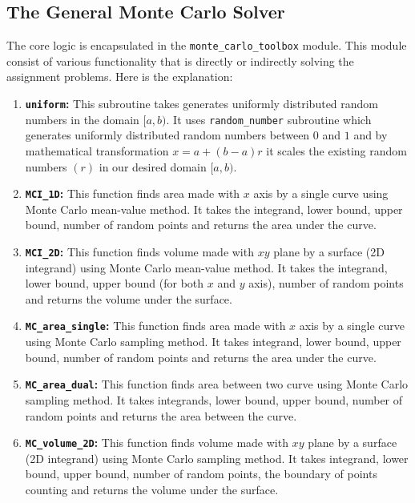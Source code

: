 \documentclass[12pt, a4paper, twoside]{article}
\begin{document}
        \subsection{The General Monte Carlo Solver}
        The core logic is encapsulated in the \texttt{monte\_carlo\_toolbox} module.
        This module consist of various functionality that is directly or indirectly solving the assignment problems. Here is the explanation:
        \begin{enumerate}
            \item {\bf \texttt{uniform}:} This subroutine takes generates uniformly distributed random numbers in the domain $[a, b)$. It uses \texttt{random\_number} subroutine which generates uniformly distributed random numbers between $0$ and $1$ and by mathematical transformation $x = a + (b - a)r$ it scales the existing random numbers $(r)$ in our desired domain $[a, b)$.
            \item {\bf \texttt{MCI\_1D}:} This function finds area made with $x$ axis by a single curve using Monte Carlo mean-value method. It takes the integrand, lower bound, upper bound, number of random points and returns the area under the curve.
            \item {\bf \texttt{MCI\_2D}:} This function finds volume made with $xy$ plane by a surface (2D integrand) using Monte Carlo mean-value method. It takes the integrand, lower bound, upper bound (for both $x$ and $y$ axis), number of random points and returns the volume under the surface.
            \item {\bf \texttt{MC\_area\_single}:} This function finds area made with $x$ axis by a single curve using Monte Carlo sampling method. It takes integrand, lower bound, upper bound, number of random points and returns the area under the curve.
            \item {\bf \texttt{MC\_area\_dual}:} This function finds area between two curve using Monte Carlo sampling method. It takes integrands, lower bound, upper bound, number of random points and returns the area between the curve.
            \item {\bf \texttt{MC\_volume\_2D}:} This function finds volume made with $xy$ plane by a surface (2D integrand) using Monte Carlo sampling method. It takes integrand, lower bound, upper bound, number of random points, the boundary of points counting and returns the volume under the surface.
        \end{enumerate}
        
        
\end{document}
